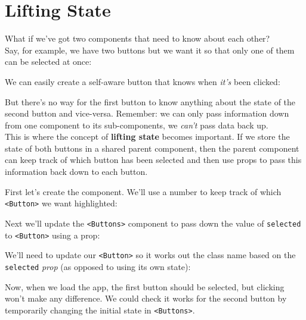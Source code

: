 \section{Lifting State}

What if we've got two components that need to know about each other?
\\

Say, for example, we have two buttons but we want it so that only one of them can be selected at once:


We can easily create a self-aware button that knows when \textit{it's} been clicked:


But there's no way for the first button to know anything about the state of the second button and vice-versa. Remember: we can only pass information down from one component to its sub-components, we \textit{can't} pass data back up.
\\


This is where the concept of \textbf{lifting state} becomes important. If we store the state of both buttons in a shared parent component, then the parent component can keep track of which button has been selected and then use props to pass this information back down to each button.

\pagebreak

First let's create the component. We'll use a number to keep track of which \texttt{<Button>} we want highlighted:



Next we'll update the \texttt{<Buttons>} component to pass down the value of \texttt{selected} to \texttt{<Button>} using a prop:


We'll need to update our \texttt{<Button>} so it works out the class name based on the \texttt{selected} \textit{prop} (as opposed to using its own state):


Now, when we load the app, the first button should be selected, but clicking won't make any difference.  We could check it works for the second button by temporarily changing the initial state in \texttt{<Buttons>}.
\\

